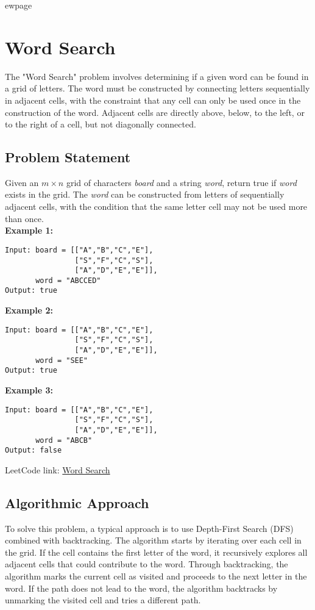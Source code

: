 
ewpage
\chapter{Word Search}
\label{chap:Word_Search}

The "Word Search" problem involves determining if a given word can be found in a grid of letters. The word must be constructed by connecting letters sequentially in adjacent cells, with the constraint that any cell can only be used once in the construction of the word. Adjacent cells are directly above, below, to the left, or to the right of a cell, but not diagonally connected.

\section*{Problem Statement}
Given an \( m \times n \) grid of characters \textit{board} and a string \textit{word}, return true if \textit{word} exists in the grid. The \textit{word} can be constructed from letters of sequentially adjacent cells, with the condition that the same letter cell may not be used more than once.\\

\textbf{Example 1:}
\begin{verbatim}
Input: board = [["A","B","C","E"],
                ["S","F","C","S"],
                ["A","D","E","E"]],
       word = "ABCCED"
Output: true
\end{verbatim}

\textbf{Example 2:}
\begin{verbatim}
Input: board = [["A","B","C","E"],
                ["S","F","C","S"],
                ["A","D","E","E"]],
       word = "SEE"
Output: true
\end{verbatim}

\textbf{Example 3:}
\begin{verbatim}
Input: board = [["A","B","C","E"],
                ["S","F","C","S"],
                ["A","D","E","E"]],
       word = "ABCB"
Output: false
\end{verbatim}

LeetCode link: \href{https://leetcode.com/problems/word-search/}{Word Search}

\section*{Algorithmic Approach}
To solve this problem, a typical approach is to use Depth-First Search (DFS) combined with backtracking. The algorithm starts by iterating over each cell in the grid. If the cell contains the first letter of the word, it recursively explores all adjacent cells that could contribute to the word. Through backtracking, the algorithm marks the current cell as visited and proceeds to the next letter in the word. If the path does not lead to the word, the algorithm backtracks by unmarking the visited cell and tries a different path.


